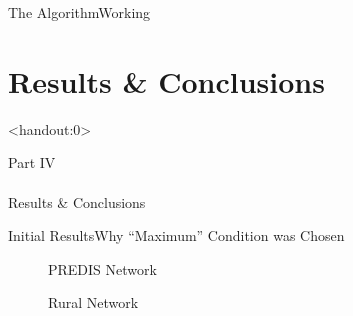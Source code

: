\documentclass[xcolor=svgnames,aspectratio=32,8pt]{beamer}
\begin{document}
\begin{frame}
  {The Algorithm}{Working}
    \vspace{0.6cm}
    \begin{changemargin}{-1cm}{-1cm}
    \begin{figure}[!h]
    \centering
    \resizebox{0.95\paperwidth}{!}{%
    
    }
    \end{figure}
    \end{changemargin}
\end{frame}






\section
  {Results \& Conclusions}

\begin{frame}<handout:0>
  {}{}
  \begin{changemargin}{-1cm}{-1cm}
  \centering
  {\Huge \color{evolvdso} Part IV\\\ \\Results \& Conclusions}
  \end{changemargin}
\end{frame}

\begin{frame}
  {Initial Results}{Why ``Maximum'' Condition was Chosen}
\begin{changemargin}{-1cm}{-1cm}
\centering
\vspace{0.35cm}
  \begin{minipage}[!h]{0.5\paperwidth}
    \begin{figure}[!h]
      \centering
      PREDIS Network
      \setlength\figureheight{3.5cm}
      \setlength\figurewidth{0.35\paperwidth}
      
    \end{figure}
  \end{minipage}%
  \begin{minipage}[!h]{0.5\paperwidth}
    \begin{figure}[!h]
      \centering
      Rural Network
      \setlength\figureheight{3.5cm}
      \setlength\figurewidth{0.35\paperwidth}
      
    \end{figure}
  \end{minipage}
\end{changemargin}
\end{frame}
\end{document}
